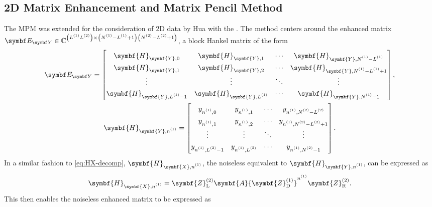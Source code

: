 \subsection{2D Matrix Enhancement and Matrix Pencil Method}
\label{subsec:mmempm}
The \ac{MPM} was extended for the consideration of \ac{2D} data by Hua with the
\cite{Hua1992}. The method centers around the enhanced matrix $\EY
\in \mathbb{C}^{\left(\Lone \Ltwo\right) \times \left(\None - \Lone +
1\right)\left(\Ntwo - \Ltwo + 1\right)}$, a block Hankel matrix of the form
\begin{subequations}
    \begin{gather}
        \EY =
        \begin{bmatrix}
            \symbf{H}_{\symbf{Y},0} & \symbf{H}_{\symbf{Y},1} & \cdots & \symbf{H}_{\symbf{Y},\None - \Lone} \\
            \symbf{H}_{\symbf{Y},1} & \symbf{H}_{\symbf{Y},2} & \cdots & \symbf{H}_{\symbf{Y},\None - \Lone + 1} \\
            \vdots & \vdots & \ddots & \vdots \\
            \symbf{H}_{\symbf{Y},\Lone - 1} & \symbf{H}_{\symbf{Y},\Lone} & \cdots & \symbf{H}_{\symbf{Y},\None - 1}
        \end{bmatrix}, \\
        \def\arraystretch{1.3}
        \symbf{H}_{\symbf{Y},\none} =
        \begin{bmatrix}
            y_{ \none, 0 } & y_{ \none, 1 } & \cdots & y_{ \none, \Ntwo - \Ltwo } \\
            y_{ \none, 1 } & y_{ \none, 2 } & \cdots & y_{ \none, \Ntwo - \Ltwo + 1 } \\
            \vdots & \vdots & \ddots & \vdots \\
            y_{ \none, \Ltwo - 1 } & y_{ \none, \Ltwo } & \cdots & y_{ \none, \Ntwo - 1 }
        \end{bmatrix}.
    \end{gather}
\end{subequations}
In a similar fashion to \cref{eq:HX-decomp},
$\symbf{H}_{\symbf{X},\none}$, the noiseless equivalent to
$\symbf{H}_{\symbf{Y},\none}$, can be expressed as
\begin{equation}
    \symbf{H}_{\symbf{X},\none} =
        \symbf{Z}^{(2)}_{\text{L}}
        \symbf{A}
        {\symbf{Z}^{(1)}_{\text{D}}}^{\none}
        \symbf{Z}^{(2)}_{\text{R}}.
\end{equation}
This then enables the noiseless enhanced matrix to be expressed as
